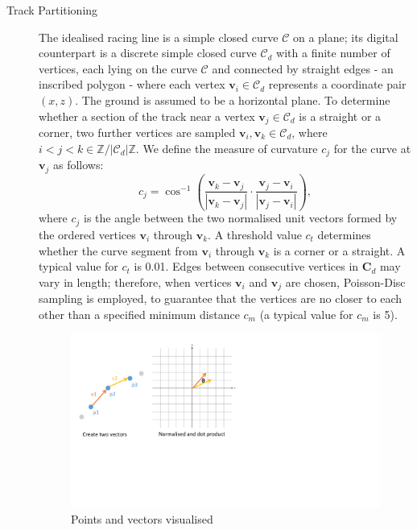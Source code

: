 \begin{description}
	\item [Track Partitioning] The idealised racing line is a simple closed curve $\mathcal{C}$ on a plane; its digital counterpart is a discrete simple closed curve $\mathcal{C}_d$ with a finite number of vertices, each lying on the curve $\mathcal{C}$ and connected by straight edges - an inscribed polygon - where each vertex $\mathbf{v}_i \in \mathcal{C}_d$ represents a coordinate pair $(x,z)$. The ground is assumed to be a horizontal plane. 	To determine whether a section of the track near a vertex $\mathbf{v}_j \in \mathcal{C}_d$ is a straight or a corner, two further vertices are sampled $\mathbf{v}_i, \mathbf{v}_k \in \mathcal{C}_d$, where $i < j < k \in \mathbb{Z}/|\mathcal{C}_d|\mathbb{Z}$. We define the measure of curvature $c_j$ for the curve at $\mathbf{v}_j$ as follows:
	\begin{equation}
		c_j = \cos^{-1} \left(\frac{\mathbf{v}_k - \mathbf{v}_j}{|\mathbf{v}_k - \mathbf{v}_j|} \cdot \frac{\mathbf{v}_j - \mathbf{v}_i}{|\mathbf{v}_j - \mathbf{v}_i|} \right),
	\end{equation}
	where $c_j$ is the angle between the two normalised unit vectors formed by the ordered vertices $\mathbf{v}_i$ through $\mathbf{v}_k$. A threshold value $c_t$ determines whether the curve segment from $\mathbf{v}_i$ through $\mathbf{v}_k$ is a corner or a straight. A typical value for $c_t$ is 0.01. Edges between consecutive vertices in $\mathbf{C}_d$ may vary in length; therefore, when vertices $\mathbf{v}_i$ and $\mathbf{v}_j$ are chosen, Poisson-Disc sampling is employed, to guarantee that the vertices are no closer to each other than a specified minimum distance $c_m$ (a typical value for $c_m$ is 5).  	

	\begin{figure}[!htb]
		\centering
		\includegraphics[width=\textwidth]{diagrams/vectorCorners.pdf}
		\caption[Splicing using vectors]{Points and vectors visualised}
		\label{fig:diagram-vectorCorners}
	\end{figure}
	

\end{description}
